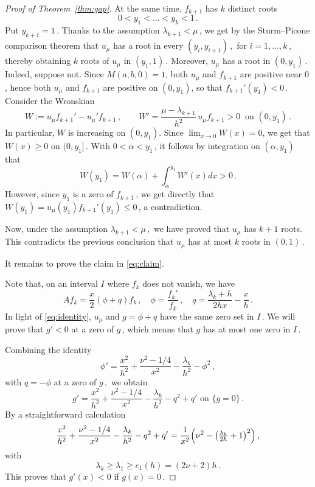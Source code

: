 \documentclass[11pt]{amsart}
\numberwithin{equation}{section}
\theoremstyle{remark}
\newcommand{\mn}{\medskip\noindent}
\begin{document}
\begin{proof}[Proof of Theorem~\ref{thm:gap}]
At the same time, $f_{k+1}$ has $k$ distinct roots
\[0<y_1<\ldots<y_{k}<1\,.\]
Put $y_{k+1}=1\,$. Thanks to the assumption $\lambda_{k+1}<\mu\,$, we get by the Sturm–Picone comparison theorem \cite[Theorem~B$^*$]{H}  that $u_\mu$ has a root in every $(y_i,y_{i+1})\,,$ for $i=1,\ldots,k\,$, thereby obtaining $k$ roots of $u_\mu$ in $(y_1,1)\,$. Moreover, $u_\mu$ has 
a root in $(0,y_1)\,$. Indeed, suppose not. Since $M(a,b,0)=1$,
both $u_\mu$ and $f_{k+1}$ are positive near $0\,$, hence both $u_\mu$ and $f_{k+1}$ are positive 
on $(0,y_1)$, so that $f_{k+1}'(y_1)<0\,$. Consider the Wronskian
\[
W:=u_\mu f_{k+1}'-u_\mu' f_{k+1}\,,\qquad
W'=\frac{\mu-\lambda_{k+1}}{h^2}\,u_\mu f_{k+1}>0\ \text{ on }(0,y_1)\,.
\]
In particular, $W$ is increasing on $(0,y_1)$. Since $\lim_{x\to0}W(x)=0$, we get that $W(x)\geq 0$ on $(0,y_1]\,$. With $0<\alpha<y_1\,$, it follows by integration on $(\alpha,y_1)\,$ that
\[W(y_1)=W(\alpha)+\int_\alpha^{y_1}W'(x)dx>0\,.\]
% 
However, since $y_1$ is a zero of $f_{k+1}\,$, we get directly that $W(y_1)=u_\mu(y_1)f_{k+1}'(y_1)\leq 0\,$, a contradiction. 

Now, under the assumption $\lambda_{k+1}<\mu\,,$  we have proved that $u_\mu$ has $k+1$ roots. This contradicts the previous conclusion that $u_\mu$ has at most $k$ roots in $(0,1)\,$.\mn

It remains to prove the claim in \eqref{eq:claim}.

Note that, on an interval $I$ where $f_k$ does not vanish, we have 
\[Af_k=\frac{x}{2}(\phi+q)f_k\,,\quad \phi=\frac{f_k'}{f_k}\,,\quad q=\frac{\lambda_k+h}{2hx}-\frac{x}{h}\,.\]
In light of \eqref{eq:identity}, $u_\mu$ and $g=\phi+q$ have the same zero set in $I\,$. We will prove that $g'<0$ at a zero of $g$\,, which means that $g$ has at most one zero in $I$\,.

Combining the identity
\[\phi'=\frac{x^2}{h^2}+\frac{\nu^2-1/4}{x^2}-\frac{\lambda_k}{h^2}-\phi^2\,,\]
with $q=-\phi$ at a zero of $g\,,$ we obtain 
\[g'=\frac{x^2}{h^2}+\frac{\nu^2-1/4}{x^2}-\frac{\lambda_k}{h^2}-q^2+q' \text{ on }\{g=0\}\,.\]
By a straightforward calculation
\[\frac{x^2}{h^2}+\frac{\nu^2-1/4}{x^2}-\frac{\lambda_k}{h^2}-q^2+q'=\frac{1}{x^2}\Bigl(\nu^2-\bigl(\tfrac{\lambda_k}{2h}+1\bigr)^2\Bigr)\,,\]
with
\[\lambda_k\geq  \lambda_1\geq e_1(h)=(2\nu+2)h\,.\]
This proves that $g'(x)<0$ if $g(x)=0$\,.
\end{proof}
\end{document}

